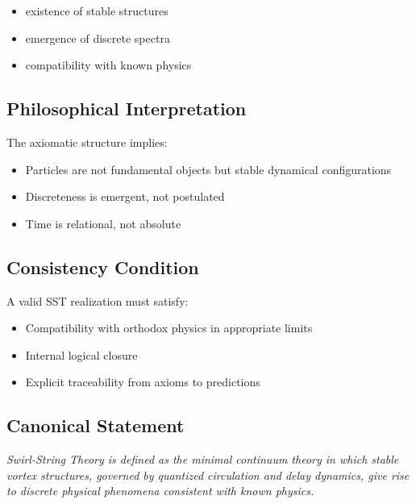 \documentclass[11pt]{article}
\theoremstyle{definition}
\theoremstyle{plain}
\theoremstyle{remark}
\begin{document}
        \begin{itemize}
            \item existence of stable structures
            \item emergence of discrete spectra
            \item compatibility with known physics
        \end{itemize}
    
    \subsection{Philosophical Interpretation}
        
        The axiomatic structure implies:
        
        \begin{itemize}
            \item Particles are not fundamental objects but stable dynamical configurations
            \item Discreteness is emergent, not postulated
            \item Time is relational, not absolute
        \end{itemize}
    
    \subsection{Consistency Condition}
        
        A valid SST realization must satisfy:
        
        \begin{itemize}
            \item Compatibility with orthodox physics in appropriate limits
            \item Internal logical closure
            \item Explicit traceability from axioms to predictions
        \end{itemize}
    
    \subsection{Canonical Statement}
        
        \begin{center}
            \textit{
                Swirl-String Theory is defined as the minimal continuum theory in which stable vortex structures, governed by quantized circulation and delay dynamics, give rise to discrete physical phenomena consistent with known physics.
            }
        \end{center}
\end{document}

